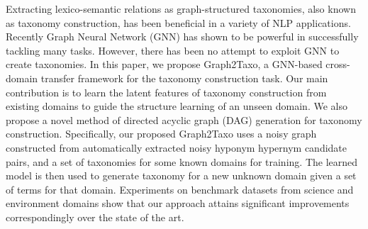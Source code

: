 Extracting lexico-semantic relations as graph-structured taxonomies, also known as taxonomy construction, has been beneficial in a variety of NLP applications. Recently Graph Neural Network (GNN) has shown to be powerful in successfully tackling many tasks. However, there has been no attempt to exploit GNN to create taxonomies. In this paper, we propose Graph2Taxo, a GNN-based cross-domain transfer framework for the taxonomy construction task. Our main contribution is to learn the latent features of taxonomy construction from existing domains to guide the structure learning of an unseen domain. We also propose a novel method of directed acyclic graph (DAG) generation for taxonomy construction. Specifically, our proposed Graph2Taxo uses a noisy graph constructed from automatically extracted noisy hyponym hypernym candidate pairs, and a set of taxonomies for some known domains for training. The learned model is then used to generate taxonomy for a new unknown domain given a set of terms for that domain. Experiments on benchmark datasets from science and environment domains show that our approach attains significant improvements correspondingly over the state of the art.
